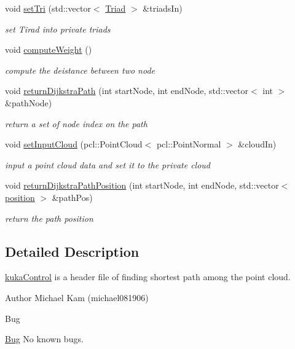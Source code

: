 \begin{DoxyCompactItemize}
void \hyperlink{classdijkstraPQ_ad0924e412f8dc0be262aa6a1efd819fb}{set\+Tri} (std\+::vector$<$ \hyperlink{structTriad}{Triad} $>$ \&triads\+In)
\begin{DoxyCompactList}\small\item\em set Tirad into private triads \end{DoxyCompactList}\item 
void \hyperlink{classdijkstraPQ_ac83c4c4f6604fbf34cf0de15b254bdd4}{compute\+Weight} ()
\begin{DoxyCompactList}\small\item\em compute the deistance between two node \end{DoxyCompactList}\item 
void \hyperlink{classdijkstraPQ_abe1e628c3e5a6523c6570dcda990f65e}{return\+Dijkstra\+Path} (int start\+Node, int end\+Node, std\+::vector$<$ int $>$ \&path\+Node)
\begin{DoxyCompactList}\small\item\em return a set of node index on the path \end{DoxyCompactList}\item 
void \hyperlink{classdijkstraPQ_abd8f3d392cba1bf31d120a2fe4189189}{set\+Input\+Cloud} (pcl\+::\+Point\+Cloud$<$ pcl\+::\+Point\+Normal $>$ \&cloud\+In)
\begin{DoxyCompactList}\small\item\em input a point cloud data and set it to the private cloud \end{DoxyCompactList}\item 
void \hyperlink{classdijkstraPQ_a50558d5dcb4d525e13721f5d8a03ef14}{return\+Dijkstra\+Path\+Position} (int start\+Node, int end\+Node, std\+::vector$<$ \hyperlink{structposition}{position} $>$ \&path\+Pos)
\begin{DoxyCompactList}\small\item\em return the path position \end{DoxyCompactList}\end{DoxyCompactItemize}


\subsection{Detailed Description}
\hyperlink{classkukaControl}{kuka\+Control} is a header file of finding shortest path among the point cloud. 

\begin{DoxyAuthor}{Author}
Michael Kam (michael081906) 
\end{DoxyAuthor}
\begin{DoxyRefDesc}{Bug}
\item[\hyperlink{bug__bug000004}{Bug}]No known bugs. \end{DoxyRefDesc}


